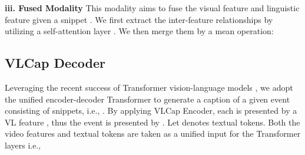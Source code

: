 \documentclass{article}
\begin{document}
\begin{table*}[!b]\centering
\caption{Performance comparison of \model with other SOTA models on YouCookII validation set.}
\label{tab:youcook}
\vspace{-5mm}
\end{table*}


\noindent
\textbf{iii. Fused Modality}
This modality aims to fuse the visual feature  and linguistic feature  given a snippet . We first extract the inter-feature relationships by utilizing a self-attention layer \cite{vaswani2017attention}. We then merge them by a mean operation:
\vspace{-1.3mm}


\vspace{-3mm}
\subsection{VLCap Decoder}
\vspace{-3mm}
Leveraging the recent success of Transformer vision-language models \cite{Chen2019uniter, lei2020mart}, we adopt the unified encoder-decoder Transformer to generate a caption of a given event  consisting of  snippets, i.e., . By applying VLCap Encoder, each  is presented by a VL feature , thus the event  is presented by . Let  denotes textual tokens. Both the video features  and textual tokens  are taken as a unified input for the Transformer layers i.e., 
\vspace{-2mm}
\end{document}
